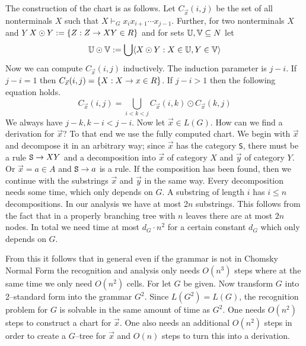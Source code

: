 The construction of the chart is as follows.
Let $C_{\vec{x}}(i,j)$ be the set of all nonterminals
$X$ such that $X \vdash_G x_i x_{i+1} \dotsb x_{j-1}$.
Further, for two nonterminals $X$ and $Y$
$X \odot Y := \{Z : Z \rightarrow XY \in R\}$ and for sets
$\mathbb{U}, \mathbb{V} \subseteq N$ let
\begin{equation}
\mathbb{U} \odot \mathbb{V} := \bigcup \langle X \odot Y : X \in \mathbb{U}, Y \in \mathbb{V}\rangle
\end{equation}
Now we can compute $C_{\vec{x}}(i,j)$ inductively. The induction
parameter is $j - i$. If $j - i = 1$ then
$C_{\vec{x}}(i,j) = \{X : X \rightarrow x \in R\}$. If $j - i > 1$ then
the following equation holds.
\begin{equation}
C_{\vec{x}}(i,j) = \bigcup_{i < k < j} C_{\vec{x}}(i,k)
\odot C_{\vec{x}}(k,j)
\end{equation}
We always have $j - k, k - i < j - i$.
Now let $\vec{x} \in L(G)$. How can we find a
derivation for $\vec{x}$? To that end we use the fully computed
chart. We begin with $\vec{x}$ and decompose it in an
arbitrary way; since $\vec{x}$ has the category {\tt S}, there must
be a rule $\mbox{\tt S} \rightarrow XY$ and a decomposition
into $\vec{x}$ of category $X$ and $\vec{y}$ of category
$Y$. Or $\vec{x} = a \in A$ and $\mbox{\tt S} \rightarrow a$ is a rule.
If the composition has been found, then we continue with the
substrings $\vec{x}$ and $\vec{y}$ in the same way.
Every decomposition needs some time, which only depends on
$G$. A substring of length $i$ has $i \leq n$ decompositions.
In our analysis we have at most 2$n$ substrings.
This follows from the fact that in a properly branching
tree with $n$ leaves there are at most $2n$ nodes. In total we
need time at most $d_G \cdot n^2$ for a certain constant
$d_G$ which only depends on $G$.

From this it follows that in general even if the grammar is not
in Chomsky Normal Form the recognition and analysis only needs
$O(n^3)$ steps where at the same time we only need $O(n^2)$ cells.
For let $G$ be given. Now transform $G$ into 2--standard form
into the grammar $G^2$. Since $L(G^2) = L(G)$, the recognition
problem for $G$ is solvable in the same amount of time as $G^2$.
One needs $O(n^2)$ steps to construct a chart for $\vec{x}$.
One also needs an additional $O(n^2)$ steps in order to create
a $G$--tree for $\vec{x}$ and $O(n)$ steps to turn this into a
derivation.

